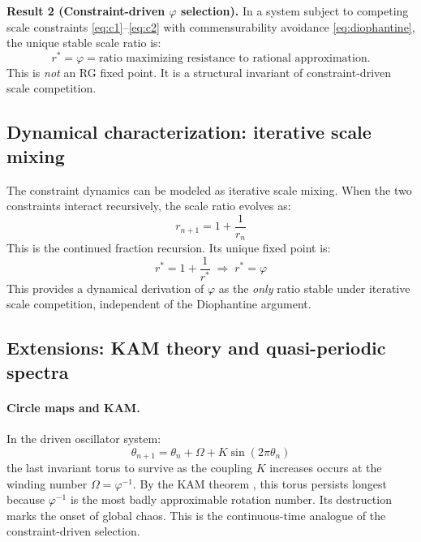 \documentclass[11pt,a4paper]{article}
\theoremstyle{plain}
\theoremstyle{definition}
\newcommand{\phiGolden}{\varphi}
\begin{document}
\begin{keybox}
\textbf{Result 2 (Constraint-driven $\phiGolden$ selection).}
In a system subject to competing scale constraints
\eqref{eq:c1}--\eqref{eq:c2} with commensurability avoidance
\eqref{eq:diophantine}, the unique stable scale ratio is:
\[
r^* = \phiGolden = \text{ratio maximizing resistance to rational
approximation}.
\]
This is \emph{not} an RG fixed point. It is a structural invariant
of constraint-driven scale competition.
\end{keybox}

\subsection{Dynamical characterization: iterative scale mixing}

The constraint dynamics can be modeled as iterative scale mixing.
When the two constraints interact recursively, the scale ratio evolves as:
\begin{equation}
r_{n+1} = 1 + \frac{1}{r_n}
\end{equation}
This is the continued fraction recursion. Its unique fixed point is:
\begin{equation}
r^* = 1 + \frac{1}{r^*} \;\Longrightarrow\; r^* = \phiGolden
\end{equation}
This provides a dynamical derivation of $\phiGolden$ as the
\emph{only} ratio stable under iterative scale competition, independent
of the Diophantine argument.

\subsection{Extensions: KAM theory and quasi-periodic spectra}

\paragraph{Circle maps and KAM.}
In the driven oscillator system:
\begin{equation}
\theta_{n+1} = \theta_n + \Omega + K\sin(2\pi\theta_n)
\end{equation}
the last invariant torus to survive as the coupling $K$ increases
occurs at the winding number $\Omega = \phiGolden^{-1}$.
By the KAM theorem \citep{kolmogorov1954,arnold1963,moser1962},
this torus persists longest because $\phiGolden^{-1}$ is the most
badly approximable rotation number. Its destruction marks the onset
of global chaos. This is the continuous-time analogue of the
constraint-driven selection.
\end{document}
